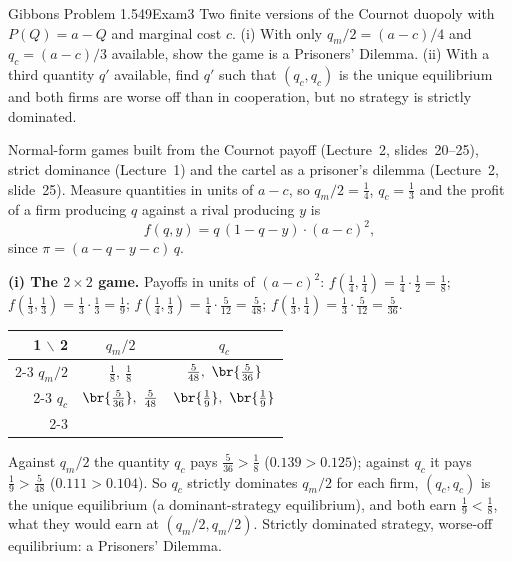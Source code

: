 \begin{exsol}{Gibbons Problem 1.5}{49}{Exam}{3}
\asked Two finite versions of the Cournot duopoly with $P(Q) = a - Q$ and marginal cost $c$.
(i) With only $q_m/2 = (a-c)/4$ and $q_c = (a-c)/3$ available, show the game is a Prisoners' Dilemma.
(ii) With a third quantity $q'$ available, find $q'$ such that $(q_c, q_c)$ is the unique equilibrium
and both firms are worse off than in cooperation, but no strategy is strictly dominated.

\method Normal-form games built from the Cournot payoff (Lecture~2, slides~20--25), strict dominance
(Lecture~1) and the cartel as a prisoner's dilemma (Lecture~2, slide~25). Measure quantities in
units of $a - c$, so $q_m/2 = \tfrac14$, $q_c = \tfrac13$ and the profit of a firm producing $q$ against a rival producing $y$ is
\[
  f(q, y) = q\,(1 - q - y)\cdot(a-c)^2 ,
\]
since $\pi = (a - q - y - c)\,q$.

\solution
\textbf{(i) The $2\times2$ game.} Payoffs in units of $(a-c)^2$:
$f(\tfrac14, \tfrac14) = \tfrac14\cdot\tfrac12 = \tfrac18$;
$f(\tfrac13, \tfrac13) = \tfrac13\cdot\tfrac13 = \tfrac19$;
$f(\tfrac14, \tfrac13) = \tfrac14\cdot\tfrac{5}{12} = \tfrac{5}{48}$;
$f(\tfrac13, \tfrac14) = \tfrac13\cdot\tfrac{5}{12} = \tfrac{5}{36}$.
\begin{center}
\begin{tabular}{r|c|c|}
\multicolumn{1}{r}{1 $\backslash$ 2} & \multicolumn{1}{c}{$q_m/2$} & \multicolumn{1}{c}{$q_c$}\\ \cline{2-3}
$q_m/2$ & $\tfrac18,\ \tfrac18$ & $\tfrac5{48},\ \br{\tfrac5{36}}$ \\ \cline{2-3}
$q_c$ & $\br{\tfrac5{36}},\ \tfrac5{48}$ & $\br{\tfrac19},\ \br{\tfrac19}$ \\ \cline{2-3}
\end{tabular}
\end{center}
Against $q_m/2$ the quantity $q_c$ pays $\tfrac5{36} > \tfrac18$ ($0.139 > 0.125$); against $q_c$ it pays
$\tfrac19 > \tfrac5{48}$ ($0.111 > 0.104$). So $q_c$ strictly dominates $q_m/2$ for each firm, $(q_c,q_c)$ is the
unique equilibrium (a dominant-strategy equilibrium), and both earn $\tfrac19 < \tfrac18$, what they
would earn at $(q_m/2, q_m/2)$. Strictly dominated strategy, worse-off equilibrium: a Prisoners' Dilemma.


\end{exsol}
